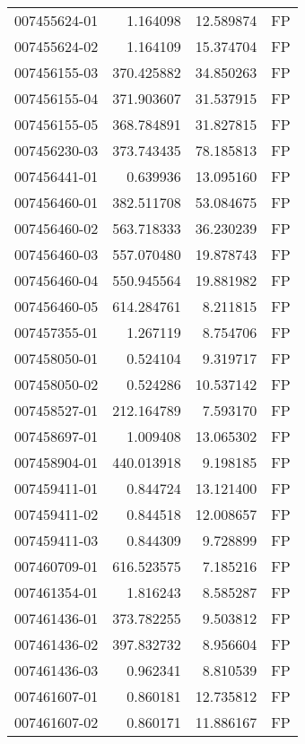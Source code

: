 \begin{tabular}{lrrl}
007455624-01 &    1.164098 &      12.589874 &   FP \\
007455624-02 &    1.164109 &      15.374704 &   FP \\
007456155-03 &  370.425882 &      34.850263 &   FP \\
007456155-04 &  371.903607 &      31.537915 &   FP \\
007456155-05 &  368.784891 &      31.827815 &   FP \\
007456230-03 &  373.743435 &      78.185813 &   FP \\
007456441-01 &    0.639936 &      13.095160 &   FP \\
007456460-01 &  382.511708 &      53.084675 &   FP \\
007456460-02 &  563.718333 &      36.230239 &   FP \\
007456460-03 &  557.070480 &      19.878743 &   FP \\
007456460-04 &  550.945564 &      19.881982 &   FP \\
007456460-05 &  614.284761 &       8.211815 &   FP \\
007457355-01 &    1.267119 &       8.754706 &   FP \\
007458050-01 &    0.524104 &       9.319717 &   FP \\
007458050-02 &    0.524286 &      10.537142 &   FP \\
007458527-01 &  212.164789 &       7.593170 &   FP \\
007458697-01 &    1.009408 &      13.065302 &   FP \\
007458904-01 &  440.013918 &       9.198185 &   FP \\
007459411-01 &    0.844724 &      13.121400 &   FP \\
007459411-02 &    0.844518 &      12.008657 &   FP \\
007459411-03 &    0.844309 &       9.728899 &   FP \\
007460709-01 &  616.523575 &       7.185216 &   FP \\
007461354-01 &    1.816243 &       8.585287 &   FP \\
007461436-01 &  373.782255 &       9.503812 &   FP \\
007461436-02 &  397.832732 &       8.956604 &   FP \\
007461436-03 &    0.962341 &       8.810539 &   FP \\
007461607-01 &    0.860181 &      12.735812 &   FP \\
007461607-02 &    0.860171 &      11.886167 &   FP \\

\end{tabular}
